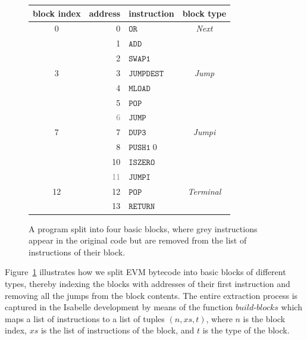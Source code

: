\documentclass[sigplan,10pt]{acmart}\settopmatter{printfolios=true,printccs=false,printacmref=false}
\newcommand{\instr}[1]{\mathtt{#1}}
\newcommand{\bblocks}{\mathit{build\mbox{-}blocks}}
\begin{document}
\begin{figure}[ht!]
\begin{tabular}{c | r l | c}
                block index & address & instruction & block type\\
                        \hline
                {0}&       0       &       $\instr{OR}$&\textit{Next}\\
                &       1       &       $\instr{ADD}$&\\
                &    2       &       $\instr{SWAP1}$&  \\
                        \hline
                {3}&       3       &       $\instr{JUMPDEST}$&\textit{Jump}\\
                &       4       &       $\instr{MLOAD}$&\\
                &       5       &       $\instr{POP}$&\\
                &    \textcolor{gray}{6}     &       {\color{gray}$\instr{JUMP}$}& \\
                        \hline
                {7}&       7       &       $\instr{DUP3}$&\textit{Jumpi}\\
                &       8       &       $\instr{PUSH1}\;0$&\\
                &       10      &       $\instr{ISZERO}$&\\
                &    \textcolor{gray}{11}    &       {\color{gray}$\instr{JUMPI}$}& \\
                        \hline
                {12}&       12      &       $\instr{POP}$&\textit{Terminal}\\
                &   13      &       $\instr{RETURN}$& \\
                        \hline
        \end{tabular}
\caption{A program split into four basic blocks, where grey instructions appear in the original
         code but are removed from the list of instructions of their block.}
\label{fig:basicblocks}
\end{figure}
Figure~\ref{fig:basicblocks} illustrates how we split EVM bytecode into basic blocks of different
types, thereby indexing the blocks with addresses of their first instruction
and removing all the jumps from the block contents. %
The entire extraction process is captured in the Isabelle development
by means of the function $\bblocks$ which maps a list of instructions to a list of tuples $(n, \mathit{xs}, t)$,
where $n$ is the block index, $\mathit{xs}$ is the list of instructions of the block, and $t$ is the type of
the block. 
\end{document}
